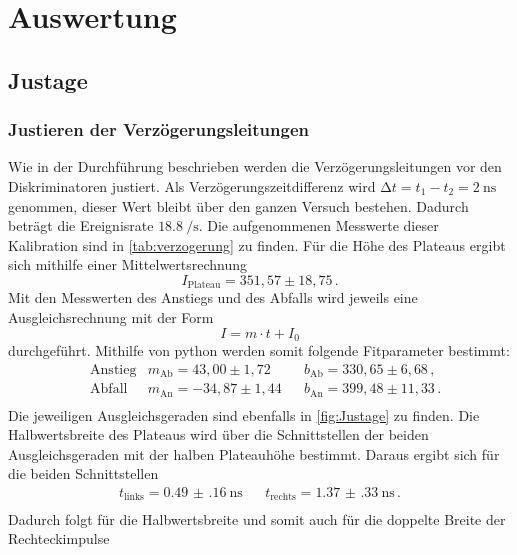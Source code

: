 \section{Auswertung}
\label{sec:Auswertung}

\subsection{Justage}
  \subsubsection{Justieren der Verzögerungsleitungen}
    Wie in der Durchführung beschrieben werden die Verzögerungsleitungen vor den Diskriminatoren justiert.
    Als Verzögerungszeitdifferenz wird $\increment t = t_1 - t_2 = \SI{2}{\nano\second}$ genommen, dieser Wert bleibt über den ganzen Versuch bestehen.
    Dadurch beträgt die Ereignisrate $\SI{18.8}{\per\second}$.
    Die aufgenommenen Messwerte dieser Kalibration sind in \autoref{tab:verzogerung} zu finden.
    Für die Höhe des Plateaus ergibt sich mithilfe einer Mittelwertsrechnung
    \begin{equation*}
      I_\text{Plateau} = 351,57 \pm 18,75 \, .
    \end{equation*}
    Mit den Messwerten des Anstiegs und des Abfalls wird jeweils eine Ausgleichsrechnung mit der Form
    \begin{equation*}
      I = m \cdot t + I_0
    \end{equation*}
    durchgeführt.
    Mithilfe von python werden somit folgende Fitparameter bestimmt:
    \begin{align*}
      &\text{Anstieg} &m_\text{Ab}=43,00 \pm 1,72   &&b_\text{Ab}= 330,65 \pm 6,68 \, ,\\
      &\text{Abfall}  &m_\text{An}=-34,87 \pm 1,44  &&b_\text{An}= 399,48 \pm 11,33 \, .\\
    \end{align*}
    Die jeweiligen Ausgleichsgeraden sind ebenfalls in \autoref{fig:Justage} zu finden.
    Die Halbwertsbreite des Plateaus wird über die Schnittstellen der beiden Ausgleichsgeraden mit der halben Plateauhöhe bestimmt.
    Daraus ergibt sich für die beiden Schnittstellen
    \begin{align*}
      t_\text{links} = \SI{0.49(16)}{\nano\second} && t_\text{rechts}= \SI{1.37(33)}{\nano\second} \, . \\
    \end{align*}
    Dadurch folgt für die Halbwertsbreite und somit auch für die doppelte Breite der Rechteckimpulse
